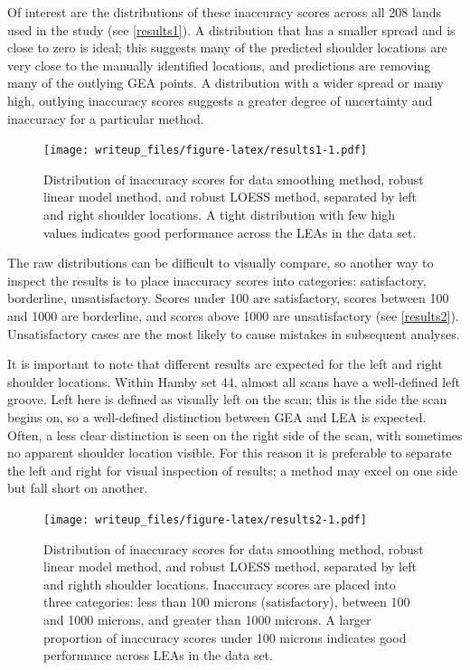 \documentclass[]{article}
\begin{document}
Of interest are the distributions of these inaccuracy scores across all
208 lands used in the study (see \autoref{results1}). A distribution
that has a smaller spread and is close to zero is ideal; this suggests
many of the predicted shoulder locations are very close to the manually
identified locations, and predictions are removing many of the outlying
GEA points. A distribution with a wider spread or many high, outlying
inaccuracy scores suggests a greater degree of uncertainty and
inaccuracy for a particular method.

\begin{figure}
\centering
\texttt{[image: writeup\_files/figure-latex/results1-1.pdf]}
\caption{\label{results1}Distribution of inaccuracy scores for data
smoothing method, robust linear model method, and robust LOESS method,
separated by left and right shoulder locations. A tight distribution
with few high values indicates good performance across the LEAs in the
data set.}
\end{figure}

The raw distributions can be difficult to visually compare, so another
way to inspect the results is to place inaccuracy scores into
categories: satisfactory, borderline, unsatisfactory. Scores under 100
are satisfactory, scores between 100 and 1000 are borderline, and scores
above 1000 are unsatisfactory (see \autoref{results2}). Unsatisfactory
cases are the most likely to cause mistakes in subsequent analyses.

It is important to note that different results are expected for the left
and right shoulder locations. Within Hamby set 44, almost all scans have
a well-defined left groove. Left here is defined as visually left on the
scan; this is the side the scan begins on, so a well-defined distinction
between GEA and LEA is expected. Often, a less clear distinction is seen
on the right side of the scan, with sometimes no apparent shoulder
location visible. For this reason it is preferable to separate the left
and right for visual inspection of results; a method may excel on one
side but fall short on another.

\begin{figure}
\centering
\texttt{[image: writeup\_files/figure-latex/results2-1.pdf]}
\caption{\label{results2}Distribution of inaccuracy scores for data
smoothing method, robust linear model method, and robust LOESS method,
separated by left and righth shoulder locations. Inaccuracy scores are
placed into three categories: less than 100 microns (satisfactory),
between 100 and 1000 microns, and greater than 1000 microns. A larger
proportion of inaccuracy scores under 100 microns indicates good
performance across LEAs in the data set.}
\end{figure}
\end{document}
